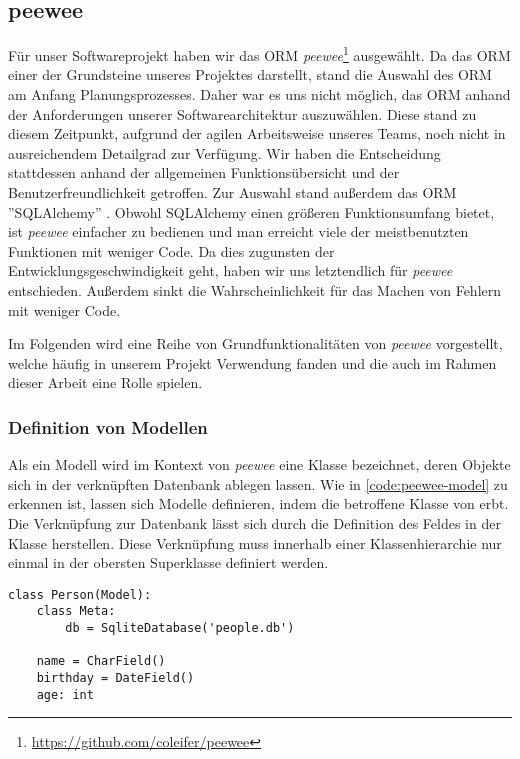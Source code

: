 \subsection{peewee}
Für unser Softwareprojekt haben wir das ORM \emph{peewee}\footnote{\url{https://github.com/coleifer/peewee}} \cite{leifer_coleiferpeewee_2023} ausgewählt. Da das ORM einer der Grundsteine unseres Projektes darstellt, stand die Auswahl des ORM am Anfang Planungsprozesses. Daher war es uns nicht möglich, das ORM  anhand der Anforderungen unserer Softwarearchitektur auszuwählen. Diese stand zu diesem Zeitpunkt, aufgrund der agilen Arbeitsweise unseres Teams, noch nicht in ausreichendem Detailgrad zur Verfügung. Wir haben die Entscheidung stattdessen anhand der allgemeinen Funktionsübersicht und der Benutzerfreundlichkeit getroffen. Zur Auswahl stand außerdem das ORM ''SQLAlchemy'' \cite{noauthor_sqlalchemy_2023}. Obwohl SQLAlchemy einen größeren Funktionsumfang bietet, ist \emph{peewee} einfacher zu bedienen und man erreicht viele der meistbenutzten Funktionen mit weniger Code. Da dies zugunsten der Entwicklungsgeschwindigkeit geht, haben wir uns letztendlich für \emph{peewee} entschieden. Außerdem sinkt die Wahrscheinlichkeit für das Machen von Fehlern mit weniger Code.

Im Folgenden wird eine Reihe von Grundfunktionalitäten von \emph{peewee} vorgestellt, welche häufig in unserem Projekt Verwendung fanden und die auch im Rahmen dieser Arbeit eine Rolle spielen.

\subsubsection*{Definition von Modellen}

Als ein Modell wird im Kontext von \emph{peewee} eine Klasse bezeichnet, deren Objekte sich in der verknüpften Datenbank ablegen lassen. Wie in \autoref{code:peewee-model} zu erkennen ist, lassen sich Modelle definieren, indem die betroffene Klasse von  erbt. Die Verknüpfung zur Datenbank lässt sich durch die Definition des Feldes  in der Klasse  herstellen. Diese Verknüpfung muss innerhalb einer Klassenhierarchie nur einmal in der obersten Superklasse definiert werden.

\lstset{language=python}
\begin{lstlisting}[caption={Python-Code zur Definition eines \emph{peewee}-Modells. Es modelliert eine Person mit einem Namen und einem Geburtstag. Weiterhin besitzt die Klasse das nicht-persistente Feld \code{age}. \cite{noauthor_quickstart_2023}}, label=code:peewee-model]
class Person(Model):
    class Meta:
        db = SqliteDatabase('people.db')

    name = CharField()
    birthday = DateField()
    age: int
\end{lstlisting}

